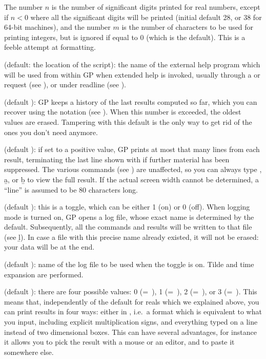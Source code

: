 The number $n$ is the number of significant digits printed for real
numbers, except if $n<0$ where all the significant digits will be printed
(initial default 28, or 38 for 64-bit machines), and the number $m$ is the
number of characters to be used for printing integers, but is ignored if
equal to 0 (which is the default). This is a feeble attempt at formatting.

 (default: the location of the  script): the
name of the external help program which will be used from within GP when
extended help is invoked, usually through a  or  request
(see ), or  under readline (see
).

 (default ): GP keeps a history of the last
 results computed so far, which you can recover using the
\kbd{\%} notation (see ). When this number is exceeded,
the oldest values are erased. Tampering with this default is the only way to
get rid of the ones you don't need anymore.

 (default ): if set to a positive value, GP prints at
most that many lines from each result, terminating the last line shown with
\kbd{[+++]} if further material has been suppressed. The various 
commands (see ) are unaffected, so you can always type
, \b{a}, or \b{b} to view the full result. If the actual
screen width cannot be determined, a ``line'' is assumed to be 80 characters
long.

 (default ): this is a toggle, which can be either 1
(on) or 0 (off). When logging mode is turned on, GP opens a log file, whose
exact name is determined by the  default. Subsequently, all the
commands and results will be written to that file (see \b{l}). In case a file
with this precise name already existed, it will not be erased: your data will
be  at the end.

 (default ): name of the log file to be
used when the  toggle is on. Tilde and time expansion are performed.

 (default ): there are four possible values: 0
(=~), 1 (=~), 2 (=~), or 3
(=~). This
means that, independently of the default  for reals which we
explained above, you can print results in four ways: either in , i.e.~a format which is equivalent to what you input, including
explicit multiplication signs, and everything typed on a line instead of
two dimensional boxes. This can have several advantages, for instance it
allows you to pick the result with a mouse or an editor, and to paste it
somewhere else.\label{se:output}

